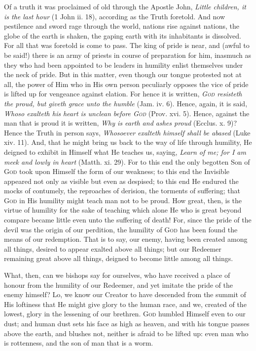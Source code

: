 Of a truth it was proclaimed of old through the Apostle John, \emph{Little children, it is the last hour} (1 John ii. 18), according as the Truth foretold. And now pestilence and sword rage through the world, nations rise against nations, the globe of the earth is shaken, the gaping earth with its inhabitants is dissolved. For all that was foretold is come to pass. The king of pride is near, and (awful to be said!) there is an army of priests in course of preparation for him, inasmuch as they who had been appointed to be leaders in humility enlist themselves under the neck of pride. But in this matter, even though our tongue protested not at all, the power of Him who in His own person peculiarly opposes the vice of pride is lifted up for vengeance against elation. For hence it is written, \emph{\textsc{God} resisteth the proud, but giveth grace unto the humble} (Jam. iv. 6). Hence, again, it is said, \emph{Whoso exalteth his heart is unclean before \textsc{God}} (Prov. xvi. 5). Hence, against the man that is proud it is written, \emph{Why is earth and ashes proud} (Ecclus. x. 9)? Hence the Truth in person says, \emph{Whosoever} \emph{exalteth himself shall be abased} (Luke xiv. 11). And, that he might bring us back to the way of life through humility, He deigned to exhibit in Himself what He teaches us, saying, \emph{Learn of me; for I am meek and lowly in heart} (Matth. xi. 29). For to this end the only begotten Son of \textsc{God} took upon Himself the form of our weakness; to this end the Invisible appeared not only as visible but even as despised; to this end He endured the mocks of contumely, the reproaches of derision, the torments of suffering; that \textsc{God} in His humility might teach man not to be proud. How great, then, is the virtue of humility for the sake of teaching which alone He who is great beyond compare became little even unto the suffering of death! For, since the pride of the devil was the origin of our perdition, the humility of \textsc{God} has been found the means of our redemption. That is to say, our enemy, having been created among all things, desired to appear exalted above all things; but our Redeemer remaining great above all things, deigned to become little among all things.

What, then, can we bishops say for ourselves, who have received a place of honour from the humility of our Redeemer, and yet imitate the pride of the enemy himself? Lo, we know our Creator to have descended from the summit of His loftiness that He might give glory to the human race, and we, created of the lowest, glory in the lessening of our brethren. \textsc{God} humbled Himself even to our dust; and human dust sets his face as high as heaven, and with his tongue passes above the earth, and blushes not, neither is afraid to be lifted up: even man who is rottenness, and the son of man that is a worm.

